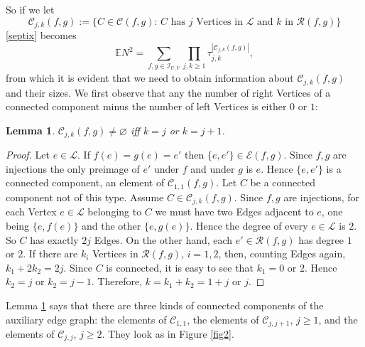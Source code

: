 \documentclass[reqno]{amsart}
\theoremstyle{theorem}
\newtheorem{lemma}[theorem]{Lemma}
\theoremstyle{definition}
\theoremstyle{remark}
\def\E{\mathbb{E}}
\def\LL{\mathscr{L}}
\def\RR{\mathscr{R}}
\def\CC{\mathscr{C}}
\def\EE{\mathscr{E}}
\newcommand{\1}{{\text{\Large $\mathfrak 1$}}}	%
\numberwithin{equation}{section}
\def\II{\mathscr I}
\newcommand{\tkside}[1]{\marginpar{\color{Fuchsia}\footnotesize \tt\bfseries #1}}
\begin{document}
So if we let
\begin{equation}
\label{compcl}
\CC_{j,k}(f,g) := \{C \in \CC(f,g):\, C \text{ has $j$ Vertices in $\LL$ and $k$ in $\RR(f,g)$}\}
\end{equation}
\eqref{septix} becomes
\begin{equation}
\label{N2bis}
\E N^2 
= \sum_{f,g \in \II_{U,V}} \prod_{j, k \ge 1} \tau_{j,k}^{|\CC_{j,k}(f,g)|},
\end{equation}
from which it is evident that we need to obtain information about
$\CC_{j,k}(f,g)$ and their sizes.
We first observe that any the number of right Vertices of a connected component
minus the number of left Vertices is either $0$ or $1$:
\begin{lemma}
\label{classlem}
$\CC_{j,k}(f,g) \neq\varnothing$ iff $k=j$ or $k=j+1$.
\end{lemma}
\begin{proof}
Let $e \in \LL$. If $f(e)=g(e)=e'$ then $\{e,e'\} \in \EE(f,g)$.
Since $f, g$ are injections the only preimage of $e'$ under $f$ and under $g$ is
$e$. Hence $\{e,e'\}$ is a connected component, an element of $\CC_{1,1}(f,g)$.
Let $C$ be a connected component not of this type. Assume $C \in \CC_{j,k}(f,g)$.
Since $f, g$ are injections,
for each Vertex $e \in \LL$ belonging to $C$ we must have two Edges
adjacent to $e$, one being $\{e,f(e)\}$ and the other $\{e,g(e)\}$. 
Hence the degree of every $e \in \LL$ is $2$.
So $C$ has exactly $2j$ Edges.
On the other hand, each $e' \in \RR(f,g)$ has degree $1$ or $2$.
If there are $k_i$ Vertices in $\RR(f,g)$, $i=1,2$, then,
counting Edges again, $k_1+2k_2=2j$. 
Since $C$ is connected, it is easy to see that $k_1= 0$ or $2$.
Hence $k_2=j$ or $k_2 = j-1$.
Therefore, $k=k_1+k_2=1+j$ or $j$.
\end{proof}

Lemma \ref{classlem} says that there are three kinds of connected components
of the auxiliary edge graph: the elements of $\CC_{1,1}$,
the elements of $\CC_{j,j+1}$, $j\ge 1$,
and the elements of $\CC_{j,j}$, $j \ge 2$. They look as
in Figure \ref{fig2}.
\end{document}
